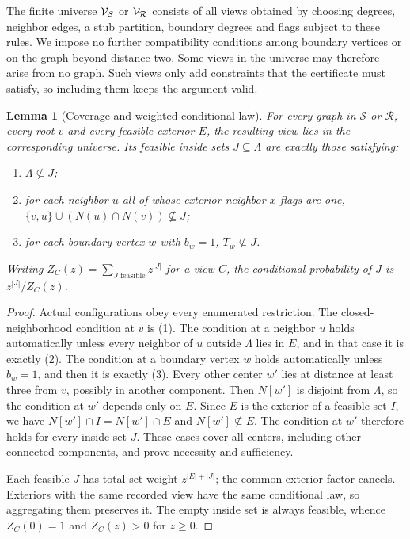 \documentclass[11pt]{article}
\newtheorem{lemma}[theorem]{Lemma}
\begin{document}
The finite universe $\mathcal V_{\mathcal S}$ or $\mathcal V_{\mathcal R}$ consists of all views obtained by choosing degrees, neighbor edges, a stub partition, boundary degrees and flags subject to these rules. We impose no further compatibility conditions among boundary vertices or on the graph beyond distance two. Some views in the universe may therefore arise from no graph. Such views only add constraints that the certificate must satisfy, so including them keeps the argument valid.


\FloatBarrier
{}

\begin{lemma}[Coverage and weighted conditional law]\label{lem:coverage}
For every graph in $\mathcal S$ or $\mathcal R$, every root $v$ and every feasible exterior $E$, the resulting view lies in the corresponding universe. Its feasible inside sets $J\subseteq \Lambda$ are exactly those satisfying:
\begin{enumerate}[label=(\arabic*),itemsep=2pt]
\item $\Lambda\nsubseteq J$;
\item for each neighbor $u$ all of whose exterior-neighbor $x$ flags are one,
$\{v,u\}\cup(N(u)\cap N(v))\nsubseteq J$;
\item for each boundary vertex $w$ with $b_w=1$, $T_w\nsubseteq J$.
\end{enumerate}
Writing $Z_C(z)=\sum_{J\text{ feasible}}z^{|J|}$ for a view $C$, the conditional probability of $J$ is $z^{|J|}/Z_C(z)$.
\end{lemma}
\begin{proof}
Actual configurations obey every enumerated restriction. The closed-neighborhood condition at $v$ is (1). The condition at a neighbor $u$ holds automatically unless every neighbor of $u$ outside $\Lambda$ lies in $E$, and in that case it is exactly (2). The condition at a boundary vertex $w$ holds automatically unless $b_w=1$, and then it is exactly (3). Every other center $w'$ lies at distance at least three from $v$, possibly in another component. Then $N[w']$ is disjoint from $\Lambda$, so the condition at $w'$ depends only on $E$. Since $E$ is the exterior of a feasible set $I$, we have $N[w']\cap I=N[w']\cap E$ and $N[w']\nsubseteq E$. The condition at $w'$ therefore holds for every inside set $J$. These cases cover all centers, including other connected components, and prove necessity and sufficiency.

Each feasible $J$ has total-set weight $z^{|E|+|J|}$; the common exterior factor cancels. Exteriors with the same recorded view have the same conditional law, so aggregating them preserves it. The empty inside set is always feasible, whence $Z_C(0)=1$ and $Z_C(z)>0$ for $z\ge0$.
\end{proof}
\end{document}
